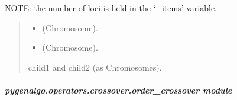 \documentclass[letterpaper,10pt,english]{sphinxmanual}
\begin{document}
\begin{fulllineitems}
\begin{fulllineitems}
\sphinxAtStartPar
NOTE: the number of loci is held in the ‘\_items’ variable.
\begin{quote}\begin{description}
\begin{itemize}
\item {} 
\sphinxAtStartPar
{} \textendash{} (Chromosome).

\item {} 
\sphinxAtStartPar
{} \textendash{} (Chromosome).

\end{itemize}

\sphinxAtStartPar
child1 and child2 (as Chromosomes).

\end{description}\end{quote}

\end{fulllineitems}


\end{fulllineitems}



\subparagraph{pygenalgo.operators.crossover.order\_crossover module}
\label{\detokenize{pygenalgo.operators.crossover:module-pygenalgo.operators.crossover.order_crossover}}\label{\detokenize{pygenalgo.operators.crossover:pygenalgo-operators-crossover-order-crossover-module}}
\end{document}
